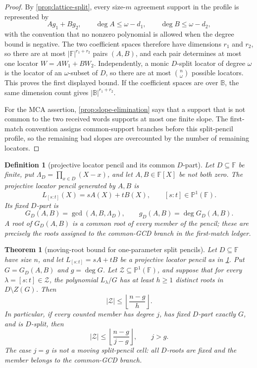 \documentclass[a4paper,11pt]{amsart}
\newtheorem{theorem}{Theorem}[section]
\newtheorem{definition}[definition]{Definition}
\theoremstyle{remark}
\newcommand{\F}{\mathbb F}
\newcommand{\B}{\mathbb B}
\begin{document}
\begin{proof}
By \cref{prop:lattice-split}, every size-\(m\) agreement support in the profile is represented by
\[
        Ag_1+Bg_2,
        \qquad
        \deg A\le\omega-d_1,
        \qquad
        \deg B\le\omega-d_2,
\]
with the convention that no nonzero polynomial is allowed when the degree bound is negative.  The two coefficient spaces therefore have dimensions \(r_1\) and \(r_2\), so there are at most \(|\F|^{r_1+r_2}\) pairs \((A,B)\), and each pair determines at most one locator \(W=AW_1+BW_2\).  Independently, a monic \(D\)-split locator of degree \(\omega\) is the locator of an \(\omega\)-subset of \(D\), so there are at most \(\binom n\omega\) possible locators.  This proves the first displayed bound.  If the coefficient spaces are over \(\B\), the same dimension count gives \(|\B|^{r_1+r_2}\).

For the MCA assertion, \cref{prop:slope-elimination} says that a support that is not common to the two received words supports at most one finite slope.  The first-match convention assigns common-support branches before this split-pencil profile, so the remaining bad slopes are overcounted by the number of remaining locators.
\end{proof}

\begin{definition}[projective locator pencil and its common \(D\)-part]\label{def:projective-locator-pencil}
Let \(D\subseteq\F\) be finite, put \(\Lambda_D=\prod_{x\in D}(X-x)\), and let \(A,B\in\F[X]\) be not both zero.  The projective locator pencil generated by \(A,B\) is
\[
        L_{[s:t]}(X)=sA(X)+tB(X),\qquad [s:t]\in\mathbb P^1(\F).
\]
Its fixed \(D\)-part is
\[
        G_D(A,B)=\gcd(A,B,\Lambda_D),
        \qquad g_D(A,B)=\deg G_D(A,B).
\]
A root of \(G_D(A,B)\) is a common root of every member of the pencil; these are precisely the roots assigned to the common-GCD branch in the first-match ledger.
\end{definition}

\begin{theorem}[moving-root bound for one-parameter split pencils]\label{thm:bc-moving-root}
Let \(D\subseteq\F\) have size \(n\), and let \(L_{[s:t]}=sA+tB\) be a projective locator pencil as in \cref{def:projective-locator-pencil}.  Put \(G=G_D(A,B)\) and \(g=\deg G\).  Let \(\mathcal Z\subseteq\mathbb P^1(\F)\), and suppose that for every \(\lambda=[s:t]\in\mathcal Z\), the polynomial \(L_\lambda/G\) has at least \(h\ge1\) distinct roots in \(D\setminus Z(G)\).  Then
\[
        |\mathcal Z|\le \left\lfloor\frac{n-g}{h}\right\rfloor .
\]
In particular, if every counted member has degree \(j\), has fixed \(D\)-part exactly \(G\), and is \(D\)-split, then
\[
        |\mathcal Z|\le
        \left\lfloor\frac{n-g}{j-g}\right\rfloor,
        \qquad j>g.
\]
The case \(j=g\) is not a moving split-pencil cell: all \(D\)-roots are fixed and the member belongs to the common-GCD branch.
\end{theorem}
\end{document}
